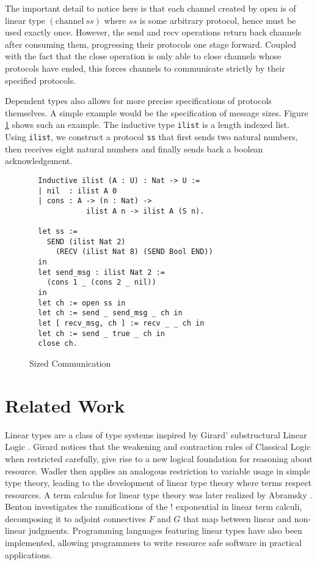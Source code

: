 \documentclass[sigplan,screen,review,authordraft]{acmart}
\newcommand{\channel}{\text{channel}}
\newcommand{\open}{\text{open}}
\newcommand{\close}{\text{close}}
\newcommand{\send}{\text{send}}
\newcommand{\recv}{\text{recv}}
\begin{document}
The important detail to notice here is that each channel created by $\open$ is of linear type $(\channel\ ss)$ where $ss$ is some arbitrary protocol, hence must be used exactly once. However, the $\send$ and $\recv$ operations return back channels after consuming them, progressing their protocols one stage forward. Coupled with the fact that the $\close$ operation is only able to close channels whose protocols have ended, this forces channels to communicate strictly by their specified protocols.

Dependent types also allows for more precise specifications of protocols themselves. A simple example would be the specification of message sizes. Figure \ref{communication} shows such an example. The inductive type \texttt{ilist} is a length indexed list. Using \texttt{ilist}, we construct a protocol \texttt{ss} that first sends two natural numbers, then receives eight natural numbers and finally sends back a boolean acknowledgement.

\begin{figure}[h]
  \caption{Sized Communication}
  \begin{verbatim}
  Inductive ilist (A : U) : Nat -> U :=
  | nil  : ilist A 0
  | cons : A -> (n : Nat) -> 
             ilist A n -> ilist A (S n).

  let ss := 
    SEND (ilist Nat 2) 
      (RECV (ilist Nat 8) (SEND Bool END)) 
  in
  let send_msg : ilist Nat 2 := 
    (cons 1 _ (cons 2 _ nil)) 
  in
  let ch := open ss in
  let ch := send _ send_msg _ ch in
  let [ recv_msg, ch ] := recv _ _ ch in
  let ch := send _ true _ ch in
  close ch.            
  \end{verbatim}
  \label{communication}
  \Description{}
\end{figure}


\section{Related Work}
Linear types are a class of type systems inspired by Girard' substructural Linear Logic \cite{girard}. Girard notices that the weakening and contraction rules of Classical Logic when restricted carefully, give rise to a new logical foundation for reasoning about resource. Wadler \cite{wadler1990,wadler1991} then applies an analogous restriction to variable usage in simple type theory, leading to the development of linear type theory where terms respect resources. A term calculus for linear type theory was later realized by Abramsky \cite{abramsky1993}. Benton \cite{benton1994} investigates the ramifications of the ! exponential in linear term calculi, decomposing it to adjoint connectives $F$ and $G$ that map between linear and non-linear judgments. Programming languages \cite{l3,ats,linear-haskell} featuring linear types have also been implemented, allowing programmers to write resource safe software in practical applications.
\end{document}
